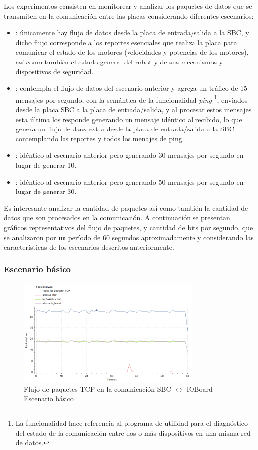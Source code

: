 \documentclass[withindex,glossary]{cam-thesis}
\begin{document}
Los experimentos consisten en monitorear y analizar los paquetes  de datos que se transmiten en la comunicación entre las placas considerando diferentes escenarios:
\begin{itemize}
	\item {}: únicamente hay flujo de datos desde la placa de entrada/salida a la \gls{SBC}, y dicho flujo corresponde a los reportes esenciales que realiza la placa para comunicar el estado de los motores (velocidades y potencias de los motores), así como también el estado general del robot y de sus mecanismos y dispositivos de seguridad.
	\item {}: contempla el flujo de datos del escenario anterior y agrega un tráfico de 15 mensajes por segundo, con la semántica de la funcionalidad \textit{ping} \footnote{La funcionalidad hace referencia al programa de utilidad para el diagnóstico del estado de la comunicación entre dos o más dispositivos en una misma red de datos.}, enviados desde la placa \gls{SBC} a la placa de entrada/salida, y al procesar estos mensajes esta última los responde generando un mensaje idéntico al recibido, lo que genera un flujo de daos extra desde la placa de entrada/salida a la \gls{SBC} contemplando los reportes y todos los menajes de ping.
	\item {}: idéntico al escenario anterior pero generando 30 mensajes por segundo en lugar de generar 10.
	\item {}: idéntico al escenario anterior pero generando 50 mensajes por segundo en lugar de generar 30.
\end{itemize}
Es interesante analizar la cantidad de paquetes así como también la cantidad de datos que son procesados en la comunicación. A continuación se presentan gráficos representativos del flujo de paquetes, y cantidad de bits por segundo, que se analizaron por un período de 60 segundos aproximadamente y considerando las características de los escenarios descritos anteriormente.

\subsubsection{Escenario básico}
\begin{figure}[H]
  \centering
  	\includegraphics[width=0.8\textwidth]{images/TCP_Throughput_io_to_pc_basic_pkps}
  	\caption[Throughput de la conexión TCP - Básico]{Flujo de paquetes TCP en la comunicación SBC $\leftrightarrow$ IOBoard -  Escenario básico}
  \label{fig:TCP_Throughput_io_to_pc_basic_pkps}
\end{figure}
\end{document}
